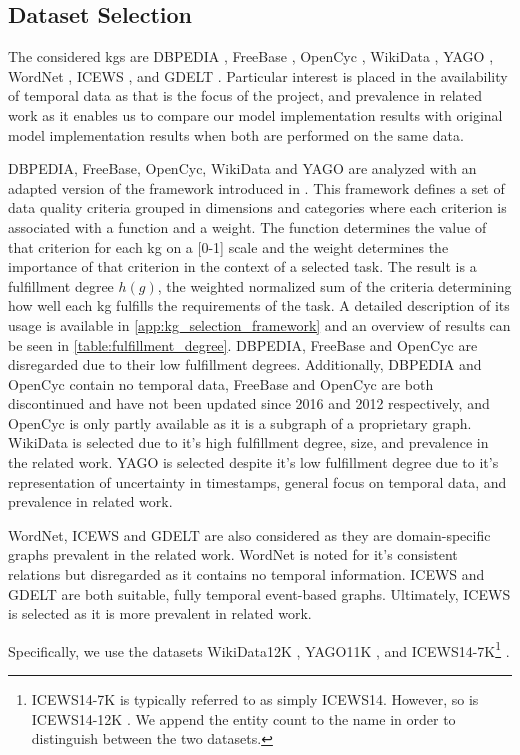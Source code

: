 \subsection{Dataset Selection}
\label{subsec:selection_of_kgs}



The considered \glspl{kg} are DBPEDIA \cite{lehmann2014dbpedia}, FreeBase \cite{bollacker2008freebase}, OpenCyc \cite{2012opencyc, lenat1995cyc}, WikiData \cite{vrandecic2014wikidata}, YAGO \cite{mahdisoltani2015YAGO3, tahon2020YAGO4}, WordNet \cite{miller1995wordnet}, ICEWS \cite{boschee2015ICEWS}, and GDELT \cite{Leetaru2013gdelt, 2023gdelt}.
Particular interest is placed in the availability of temporal data as that is the focus of the project, and prevalence in related work as it enables us to compare our model implementation results with original model implementation results when both are performed on the same data.

DBPEDIA, FreeBase, OpenCyc, WikiData and YAGO are analyzed with an adapted version of the framework introduced in \cite{farber2017dataquality}.
This framework defines a set of data quality criteria grouped in dimensions and categories where each criterion is associated with a function and a weight.
The function determines the value of that criterion for each \gls{kg} on a [0-1] scale and the weight determines the importance of that criterion in the context of a selected task.
The result is a fulfillment degree $h(g)$, the weighted normalized sum of the criteria determining how well each \gls{kg} fulfills the requirements of the task.
A detailed description of its usage is available in \autoref{app:kg_selection_framework} and an overview of results can be seen in \autoref{table:fulfillment_degree}.
DBPEDIA, FreeBase and OpenCyc are disregarded due to their low fulfillment degrees. Additionally, DBPEDIA and OpenCyc contain no temporal data, FreeBase and OpenCyc are both discontinued and have not been updated since 2016 and 2012 respectively, and OpenCyc is only partly available as it is a subgraph of a proprietary graph.
WikiData is selected due to it's high fulfillment degree, size, and prevalence in the related work.
YAGO is selected despite it's low fulfillment degree due to it's representation of uncertainty in timestamps, general focus on temporal data, and prevalence in related work.

WordNet, ICEWS and GDELT are also considered as they are domain-specific graphs prevalent in the related work.
WordNet is noted for it's consistent relations but disregarded as it contains no temporal information.
ICEWS and GDELT are both suitable, fully temporal event-based graphs. Ultimately, ICEWS is selected as it is more prevalent in related work.

Specifically, we use the datasets WikiData12K \cite{dasgupta2018hyte}, YAGO11K \cite{dasgupta2018hyte}, and ICEWS14-7K\footnote{ICEWS14-7K is typically referred to as simply ICEWS14. However, so is ICEWS14-12K \cite{trivedi2017knowevolve}. We append the entity count to the name in order to distinguish between the two datasets.} \cite{garcia-duran2018ta}.